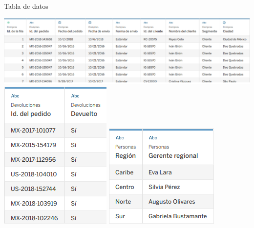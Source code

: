 \documentclass{beamer}
\begin{document}



\begin{frame}{Tabla de datos}

	\begin{center}

		\includegraphics[scale=0.3]{imagenes/Compras.png}
		\includegraphics[scale=0.3]{imagenes/Devoluciones.png}
		\includegraphics[scale=0.3]{imagenes/Personas.png}
		 

	\end{center}
	
\end{frame}
\end{document}
